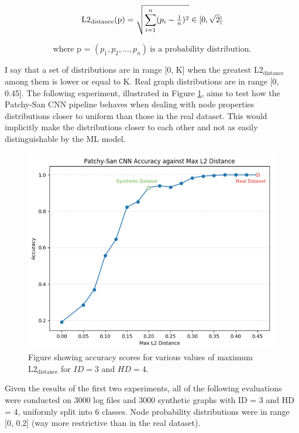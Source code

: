 \begin{equation} 
    \centering
    \text{L2}_\text{distance}\text{(p)} = \sqrt{\sum_{i=1}^{n} (p_i - \tfrac{1}{n})^2} \in [0,\sqrt{2}] \newline
\end{equation} \label{l2_distance}

$$ \text{where p = }(p_1, p_2, ..., p_n) \ \text{is a probability distribution.} $$ 

I say that a set of distributions are in range [0, K] when the greatest L2$_{\text{distance}}$ among them is lower or equal to K. Real graph distributions are in range [0, 0.45]. The following experiment, illustrated in Figure \ref{l2_dist}, aims to test how the Patchy-San CNN pipeline behaves when dealing with node properties distributions closer to uniform than those in the real dataset. This would implicitly make the distributions closer to each other and not as easily distinguishable by the ML model. \\

\begin{figure}[H]
  \centering
  \centerline{\includegraphics[scale=0.35]{Images/l2_dist.png}}
  \caption{ Figure showing accuracy scores for various values of maximum $\text{L2}_{\text{distance}}$ for $ID = 3$ and $HD = 4$.}
  \label{l2_dist}
\end{figure}

Given the results of the first two experiments, all of the following evaluations were conducted on 3000 log files and 3000 synthetic graphs with ID = 3 and HD = 4, uniformly split into 6 classes. Node probability distributions were in range [0, 0.2] (way more restrictive than in the real dataset). \\

